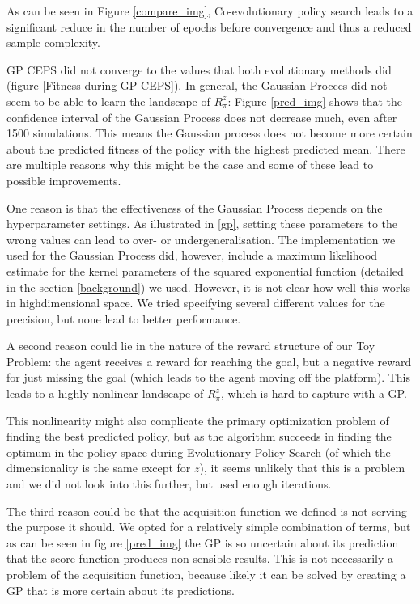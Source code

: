 As can be seen in Figure \ref{compare_img}, Co-evolutionary policy search leads to a significant reduce in the number of epochs before convergence and thus a reduced sample complexity. 

GP CEPS did not converge to the values that both evolutionary methods did (figure \ref{Fitness during GP CEPS}). In general, the Gaussian Procces did not seem to be able to learn the landscape of $R_{\pi}^z$: Figure \ref{pred_img} shows that the confidence interval of the Gaussian Process does not decrease much, even after 1500 simulations. This means the Gaussian process does not become more certain about the predicted fitness of the policy with the highest predicted mean.
There are multiple reasons why this might be the case and some of these lead to possible improvements. 

One reason is that the effectiveness of the Gaussian Process depends on the hyperparameter settings. As illustrated in \ref{gp}, setting these parameters to the wrong values can lead to over- or undergeneralisation. The implementation we used for the Gaussian Process did, however, include a maximum likelihood estimate for the kernel parameters of the squared exponential function (detailed in the section \ref{background}) we used. However, it is not clear how well this works in highdimensional space. We tried specifying several different values for the precision, but none lead to better performance. 

A second reason could lie in the nature of the reward structure of our Toy Problem: the agent receives a reward for reaching the goal, but a negative reward for just missing the goal (which leads to the agent moving off the platform). This leads to a highly nonlinear landscape of $R_{\pi}^z$, which is hard to capture with a GP. 

This nonlinearity might also complicate the primary optimization problem of finding the best predicted policy, but as the algorithm succeeds in finding the optimum in the policy space during Evolutionary Policy Search (of which the dimensionality is the same except for $z$), it seems unlikely that this is a problem and we did not look into this further, but used enough iterations.

The third reason could be that the acquisition function we defined is not serving the purpose it should. We opted for a relatively simple combination of terms, but as can be seen in figure \ref{pred_img} the GP is so uncertain about its prediction that the score function produces non-sensible results. This is not necessarily a problem of the acquisition function, because likely it can be solved by creating a GP that is more certain about its predictions.

